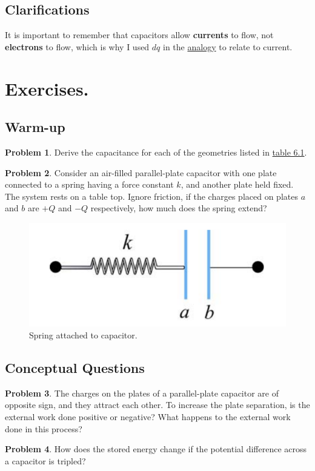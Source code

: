 \documentclass[11pt, letterpaper]{article}
\begin{document}
\subsection{Clarifications}
It is important to remember that capacitors allow \textbf{currents} to flow, not \textbf{electrons} to flow, which is why I used $dq$ in the \hyperref[fig:man]{analogy} to relate to current.

\section{Exercises.}
\subsection{Warm-up}
\textbf{Problem 1}. Derive the capacitance for each of the geometries listed in \hyperref[tbl:geometries]{table 6.1}. 

\textbf{Problem 2}. Consider an air-filled parallel-plate capacitor with one plate connected to a spring having a force constant $k$, and another plate held fixed. The system rests on a table top. Ignore friction, if the charges placed on plates $a$ and $b$ are $+Q$ and $-Q$ respectively, how much does the spring extend?
\begin{figure}[h!]
	\centering
	\includegraphics[scale=0.5]{spring.png}
	\caption{Spring attached to capacitor.}
	\label{fig:spring}
\end{figure}

\subsection{Conceptual Questions}
\textbf{Problem 3}.  The charges on the plates of a parallel-plate capacitor are of opposite sign, and they attract each other. To increase the plate separation, is the external work done positive or negative? What happens to the external work done in this process?

\textbf{Problem 4}. How does the stored energy change if the potential difference across a capacitor is tripled?
\end{document}
